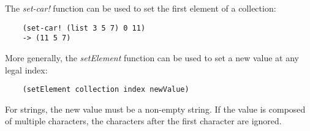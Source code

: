 The {\it set-car!} function can be used to set the first element of
a collection:

\begin{verbatim}
    (set-car! (list 3 5 7) 0 11)
    -> (11 5 7)
\end{verbatim}

More generally, the {\it setElement} function can be used to set a new value
at any legal index:

\begin{verbatim}
    (setElement collection index newValue)
\end{verbatim}

For strings, the new value must be a non-empty string. If the
value is composed of multiple characters, the characters after
the first character are ignored.
